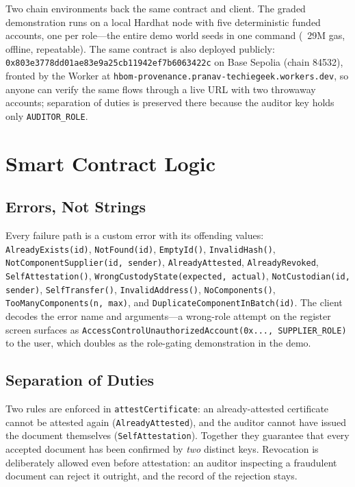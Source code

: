 \documentclass[conference]{IEEEtran}
\begin{document}
Two chain environments back the same contract and client. The graded demonstration runs on a local Hardhat node with five deterministic funded accounts, one per role---the entire demo world seeds in one command (~29M gas, offline, repeatable). The same contract is also deployed publicly: \texttt{0x803e3778dd01ae83e9a25cb11942ef7b6063422c} on Base Sepolia (chain 84532), fronted by the Worker at \texttt{hbom-provenance.pranav-techiegeek.workers.dev}, so anyone can verify the same flows through a live URL with two throwaway accounts; separation of duties is preserved there because the auditor key holds only \texttt{AUDITOR\_ROLE}.

\section{Smart Contract Logic}\label{sec:contract}

\subsection{Errors, Not Strings}
Every failure path is a custom error with its offending values: \texttt{AlreadyExists(id)}, \texttt{NotFound(id)}, \texttt{EmptyId()}, \texttt{InvalidHash()}, \texttt{NotComponentSupplier(id, sender)}, \texttt{AlreadyAttested}, \texttt{AlreadyRevoked}, \texttt{SelfAttestation()}, \texttt{WrongCustodyState(expected, actual)}, \texttt{NotCustodian(id, sender)}, \texttt{SelfTransfer()}, \texttt{InvalidAddress()}, \texttt{NoComponents()}, \texttt{TooManyComponents(n, max)}, and \texttt{DuplicateComponentInBatch(id)}. The client decodes the error name and arguments---a wrong-role attempt on the register screen surfaces as \texttt{AccessControlUnauthorizedAccount(0x..., SUPPLIER\_ROLE)} to the user, which doubles as the role-gating demonstration in the demo.

\subsection{Separation of Duties}
Two rules are enforced in \texttt{attestCertificate}: an already-attested certificate cannot be attested again (\texttt{AlreadyAttested}), and the auditor cannot have issued the document themselves (\texttt{SelfAttestation}). Together they guarantee that every accepted document has been confirmed by \emph{two} distinct keys. Revocation is deliberately allowed even before attestation: an auditor inspecting a fraudulent document can reject it outright, and the record of the rejection stays.
\end{document}
